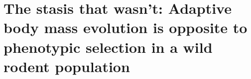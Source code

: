 \chapter[Chapter 4 -- The stasis that wasn't: Adaptive body mass evolution is opposite to phenotypic selection in a wild rodent population]{The stasis that wasn't: Adaptive body mass evolution is opposite to phenotypic selection in a wild rodent population}
\label{chap:stasis}